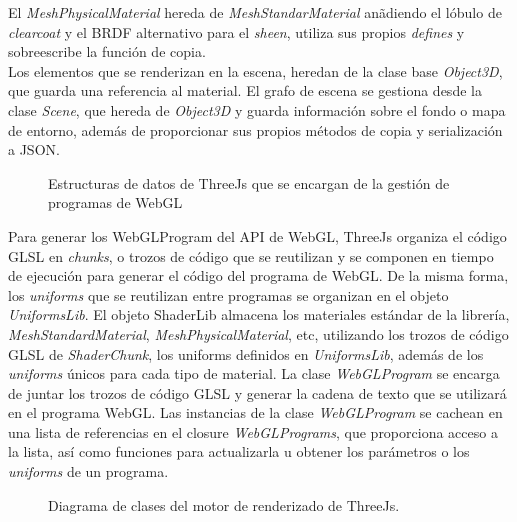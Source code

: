   El \textit{MeshPhysicalMaterial} hereda de \textit{MeshStandarMaterial} an\~adiendo el l\'obulo de \textit{clearcoat} y
  el BRDF alternativo para el \textit{sheen}, utiliza sus propios \textit{defines} y sobreescribe la funci\'on de copia.\\

  Los elementos que se renderizan en la escena, heredan de la clase base \textit{Object3D}, que guarda una referencia
  al material. El grafo de escena se gestiona desde la clase \textit{Scene}, que hereda de \textit{Object3D} y guarda
  informaci\'on sobre el fondo o mapa de entorno, adem\'as de proporcionar sus propios m\'etodos de copia y serializaci\'on
  a JSON.

  \begin{figure}[H]
    \vspace{0.5cm}
    \centering
    \caption{Estructuras de datos de ThreeJs que se encargan de la gesti\'on de programas de WebGL}
  \end{figure}

  Para generar los WebGLProgram del API de WebGL, ThreeJs organiza el c\'odigo GLSL en \textit{chunks}, o trozos de c\'odigo
  que se reutilizan y se componen en tiempo de ejecuci\'on para generar el c\'odigo del programa de WebGL. De la misma forma, los
  \textit{uniforms} que se reutilizan entre programas se organizan en el objeto \textit{UniformsLib}. El objeto ShaderLib almacena
  los materiales est\'andar de la librer\'ia, \textit{MeshStandardMaterial}, \textit{MeshPhysicalMaterial}, etc, utilizando los trozos
  de c\'odigo GLSL de \textit{ShaderChunk}, los uniforms definidos en \textit{UniformsLib}, adem\'as de los \textit{uniforms} \'unicos
  para cada tipo de material.
  La clase \textit{WebGLProgram} se encarga de juntar los trozos de c\'odigo GLSL y generar la cadena de texto que se utilizar\'a en
  el programa WebGL. Las instancias de la clase \textit{WebGLProgram} se cachean en una lista de referencias en el closure \textit{WebGLPrograms}, que proporciona
  acceso a la lista, as\'i como funciones para actualizarla u obtener los par\'ametros o los \textit{uniforms} de un programa. \\


  \begin{figure}[H]
    \vspace{0.5cm}
    \centering
    \caption{Diagrama de clases del motor de renderizado de ThreeJs.}
    \vspace{0.5cm}
  \end{figure}

